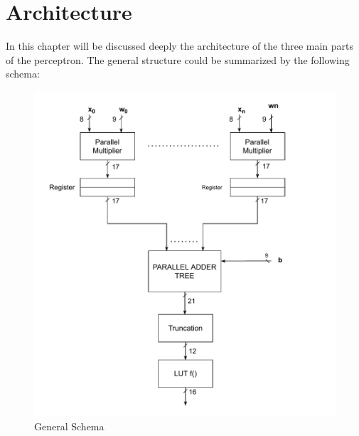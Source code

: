 \section{Architecture}

In this chapter will be discussed deeply the architecture of the three main parts of the perceptron. The general structure could be summarized by the following schema:
\begin{figure}[H]
	\centering
	\includegraphics[width=12cm]{img/architecture_general_schema.pdf}
	\caption{General Schema}
\end{figure}

